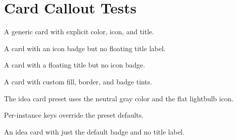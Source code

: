 \documentclass[10pt,a4paper]{article}
\begin{document}
\section*{Card Callout Tests}

\begin{cardbox}[title={Generic Card}, icon={lightbulb.pdf}, color={blue}]
  A generic card with explicit color, icon, and title.
\end{cardbox}

\begin{cardbox}[icon={search.pdf}, color={scholia-research}]
  A card with an icon badge but no floating title label.
\end{cardbox}

\begin{cardbox}[title={Title Only}, color={scholia-method}]
  A card with a floating title but no icon badge.
\end{cardbox}

\begin{cardbox}[title={Custom Tuning}, icon={star.pdf}, color={scholia-keypoint},
                 fill tint=25, border tint=60, badge tint=40]
  A card with custom fill, border, and badge tints.
\end{cardbox}

\begin{ideacard}[title={Key Insight}]
  The idea card preset uses the neutral gray color and the flat lightbulb icon.
\end{ideacard}

\begin{ideacard}[title={Overridden Color}, color=scholia-tip]
  Per-instance keys override the preset defaults.
\end{ideacard}

\begin{ideacard}
  An idea card with just the default badge and no title label.
\end{ideacard}
\end{document}
